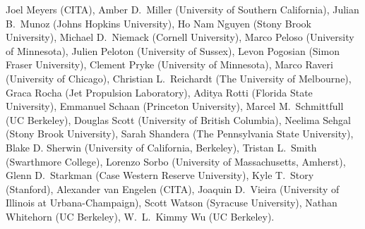 Joel Meyers (CITA),
Amber D.~Miller (University of Southern California),
Julian B.~Munoz (Johns Hopkins University),
Ho Nam Nguyen (Stony Brook University),
Michael D.~Niemack (Cornell University),
Marco Peloso (University of Minnesota),
Julien Peloton (University of Sussex),
Levon Pogosian (Simon Fraser University),
Clement Pryke (University of Minnesota),
Marco Raveri (University of Chicago),
Christian L.~Reichardt (The University of Melbourne),
Graca Rocha (Jet Propulsion Laboratory),
Aditya Rotti (Florida State University),
Emmanuel Schaan (Princeton University),
Marcel M.~Schmittfull (UC Berkeley),
Douglas Scott (University of British Columbia),
Neelima Sehgal (Stony Brook University),
Sarah Shandera (The Pennsylvania State University),
Blake D. Sherwin (University of California, Berkeley),
Tristan L.~Smith (Swarthmore College),
Lorenzo Sorbo (University of Massachusetts, Amherst),
Glenn D.~Starkman (Case Western Reserve University),
Kyle T.~Story (Stanford),
Alexander van Engelen (CITA),
Joaquin D.~Vieira (University of Illinois at Urbana-Champaign),
Scott Watson (Syracuse University),
Nathan Whitehorn (UC Berkeley),
W.~L.~Kimmy Wu (UC Berkeley).
